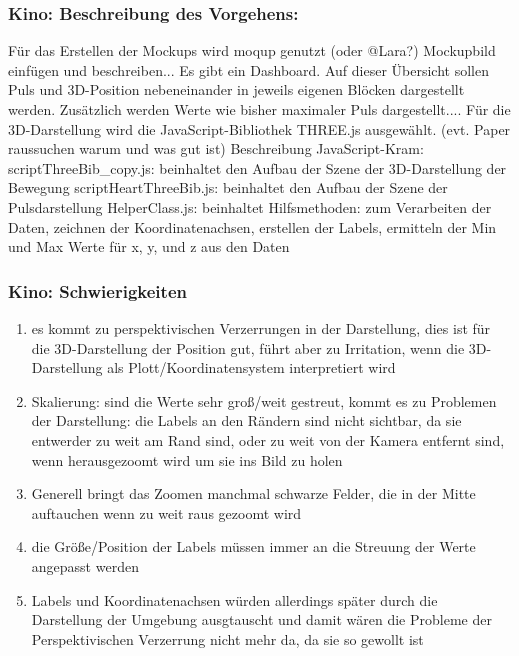 \documentclass[a4paper, 11pt]{article}
\begin{document}
\subsubsection{Kino: Beschreibung des Vorgehens:}

Für das Erstellen der Mockups wird moqup genutzt (oder @Lara?)
Mockupbild einfügen und beschreiben...\newline
\newline
Es gibt ein Dashboard. Auf dieser Übersicht sollen Puls und 3D-Position nebeneinander in jeweils eigenen Blöcken dargestellt werden.
Zusätzlich werden Werte wie bisher maximaler Puls dargestellt....\newline
\newline
Für die 3D-Darstellung wird die JavaScript-Bibliothek THREE.js ausgewählt.
(evt. Paper raussuchen warum und was gut ist)\newline
\newline
Beschreibung JavaScript-Kram: \newline
scriptThreeBib\_copy.js: beinhaltet den Aufbau der Szene der 3D-Darstellung der Bewegung \newline
scriptHeartThreeBib.js: beinhaltet den Aufbau der Szene der Pulsdarstellung \newline
HelperClass.js: beinhaltet Hilfsmethoden: zum Verarbeiten der Daten, zeichnen der Koordinatenachsen, erstellen der Labels, ermitteln der Min und Max Werte für x, y, und z aus den Daten

\subsubsection{Kino: Schwierigkeiten}
\begin{enumerate}
    \item es kommt zu perspektivischen Verzerrungen in der Darstellung, dies ist für die
  3D-Darstellung der Position gut, führt aber zu Irritation, wenn die 3D-Darstellung als
  Plott/Koordinatensystem interpretiert wird
    \item Skalierung: sind die Werte sehr groß/weit gestreut, kommt es zu Problemen der
  Darstellung: die Labels an den Rändern sind nicht sichtbar,
  da sie entwerder zu weit am Rand sind, oder zu weit von der Kamera entfernt sind,
  wenn herausgezoomt wird um sie ins Bild zu holen
    \item Generell bringt das Zoomen manchmal schwarze Felder, die in der Mitte auftauchen
  wenn zu weit raus gezoomt wird
  \item die Größe/Position der Labels müssen immer an die Streuung der Werte angepasst werden
\item Labels und Koordinatenachsen würden allerdings später durch die Darstellung der Umgebung ausgtauscht und damit wären die Probleme der Perspektivischen Verzerrung nicht mehr da, da sie so gewollt ist

\end{enumerate}
\end{document}

